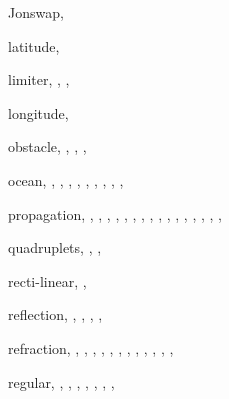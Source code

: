 \documentclass[12pt]{book}
\begin{document}
\begin{theindex}
  \indexspace

  \item Jonswap, 

  \indexspace

  \item latitude, 
  \item limiter, , , 
  \item longitude, 

  \indexspace

  \item obstacle, , , , 
  \item ocean, , , , 
		, , , 
		, , , 

  \indexspace

  \item propagation, , , 
		, , , 
		, , , 
		, , , 
		, , 
		, , , 

  \indexspace

  \item quadruplets, , , 

  \indexspace

  \item recti-linear, , 
  \item reflection, , , , 
		, 
  \item refraction, , , , 
		, , , 
		, , , 
		, , 
		, 
  \item regular, , , , 
		, , , 
		, 

  \indexspace


\end{theindex}
\end{document}
